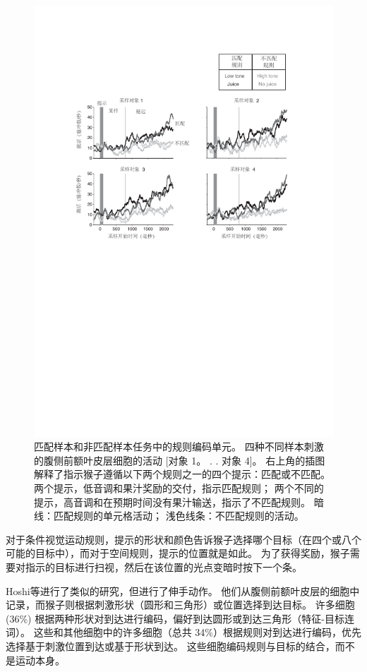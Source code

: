 \begin{figure}
	\centering
	\includegraphics[width=0.7\linewidth]{chap7/7_9}
	\caption{匹配样本和非匹配样本任务中的规则编码单元。
		四种不同样本刺激的腹侧前额叶皮层细胞的活动 [对象 1。 . . 对象 4]。
		右上角的插图解释了指示猴子遵循以下两个规则之一的四个提示：匹配或不匹配。
		两个提示，低音调和果汁奖励的交付，指示匹配规则；
		两个不同的提示，高音调和在预期时间没有果汁输送，指示了不匹配规则。 
		暗线：匹配规则的单元格活动； 浅色线条：不匹配规则的活动\cite{wallis2001single}。 \label{fig:7_9}}
\end{figure}
\par


对于条件视觉运动规则，提示的形状和颜色告诉猴子选择哪个目标（在四个或八个可能的目标中），而对于空间规则，提示的位置就是如此。 
为了获得奖励，猴子需要对指示的目标进行扫视，然后在该位置的光点变暗时按下一个条。
\par


Hoshi等\cite{hoshi1998task}进行了类似的研究，但进行了伸手动作。 
他们从腹侧前额叶皮层的细胞中记录，而猴子则根据刺激形状（圆形和三角形）或位置选择到达目标。
许多细胞 (36\%) 根据两种形状对到达进行编码，偏好到达圆形或到达三角形（特征-目标连词）。
这些和其他细胞中的许多细胞（总共 34\%）根据规则对到达进行编码，优先选择基于刺激位置到达或基于形状到达。 
这些细胞编码规则与目标的结合，而不是运动本身。
\par


